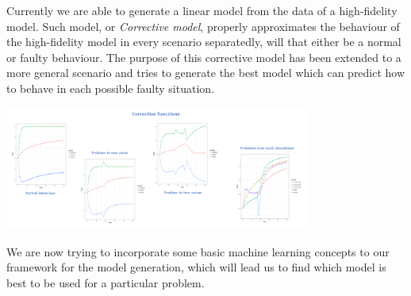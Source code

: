 \documentclass[a0paper]{tikzposter}
\begin{document}
	{
		Currently we are able to generate a linear model from the data of a
		high-fidelity model.
		Such model, or \emph{Corrective model}, properly approximates the
		behaviour of the high-fidelity model in every scenario separatedly, will
		that either be a normal or faulty behaviour.  
		The purpose of this corrective model has been extended to a more general
		scenario and tries to generate the best model which can predict how to
		behave in each possible faulty situation.

		\begin{center}
			\includegraphics[width=0.75\textwidth]{./Images/Corrective_functions.png}
		\end{center}
	}

	{
		We are now trying to incorporate some basic machine learning concepts to
		our framework for the model generation, which will lead us to find which
		model is best to be used for a particular problem.
	}

	
\end{document}
